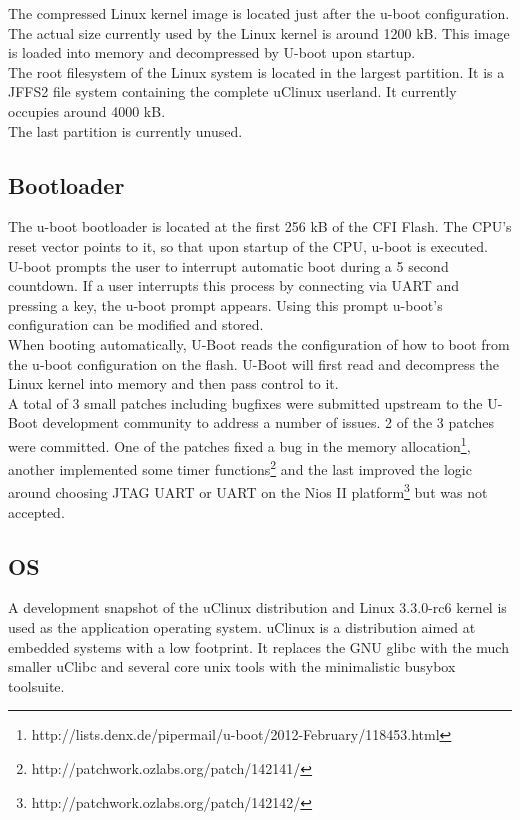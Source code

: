 The compressed Linux kernel image is located just after the u-boot configuration. The actual
size currently used by the Linux kernel is around 1200 kB. This image is loaded into memory
and decompressed by U-boot upon startup.
\\

The root filesystem of the Linux system is located in the largest partition. It is a JFFS2
file system containing the complete uClinux userland. It currently occupies around 4000 kB.
\\

The last partition is currently unused.


\newpage
\subsection{Bootloader}
The u-boot bootloader is located at the first 256 kB of the CFI Flash. The CPU's
reset vector points to it, so that upon startup of the CPU, u-boot is executed.
\\

U-boot prompts the user to interrupt automatic boot during a 5 second countdown. If a 
user interrupts this process by connecting via UART and pressing a key, the u-boot
prompt appears. Using this prompt u-boot's configuration can be modified and stored.
\\

When booting automatically, U-Boot reads the configuration of how to boot from the
u-boot configuration on the flash. U-Boot will first read and decompress the Linux
kernel into memory and then pass control to it.
\\

A total of 3 small patches including bugfixes were submitted upstream to the U-Boot development
community to address a number of issues. 2 of the 3 patches were committed. One of the patches
fixed a bug in the memory allocation\footnote{http://lists.denx.de/pipermail/u-boot/2012-February/118453.html},
another implemented some timer functions\footnote{http://patchwork.ozlabs.org/patch/142141/} and the last
improved the logic around choosing JTAG UART or UART on the Nios II platform\footnote{http://patchwork.ozlabs.org/patch/142142/} but was not accepted.
\\


\subsection{OS}
A development snapshot of the uClinux distribution and Linux 3.3.0-rc6 kernel is used as the
application operating system. uClinux is a distribution aimed at embedded systems with a low
footprint. It replaces the GNU glibc with the much smaller uClibc and several core unix tools
with the minimalistic busybox toolsuite.
\\

